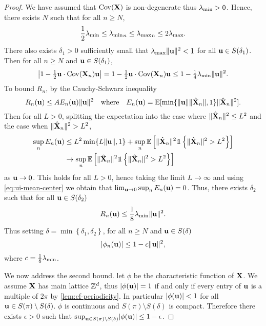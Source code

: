 \begin{proof}
    We have assumed that $\cov(\vX)$ is non-degenerate thus $\mineval > 0$. Hence, there exists $N$ such that for all $n \geq N$,
    \begin{equation*}
        \frac{1}{2} \mineval \leq \mineval_n \leq \maxeval_n \leq 2 \maxeval.
    \end{equation*}
    There also exists $\delta_1 > 0$ sufficiently small that $\maxeval \norm{\vu}^2 < 1$ for all $\vu \in S(\delta_1)$. Then for all $n \geq N$ and $\vu \in S(\delta_1)$,
    \begin{equation}
        \abs*{1 - \tfrac{1}{2} \vu \cdot \cov(\vX_n) \vu }
        = 1 - \tfrac{1}{2} \vu \cdot \cov(\vX_n) \vu
        \leq 1 - \tfrac{1}{4} \mineval \norm{\vu}^2. \label{eq:qf-bound}
    \end{equation}
    To bound $R_n$, by the Cauchy-Schwarz inequality
    \begin{equation*}
        R_n(\vu) \leq A E_n(\vu) \norm{\vu}^2
        \quad \text{where} \quad
        E_n(\vu) = \E[\min\{\norm{\vu} \norm{\centeredX_n}, 1\} \norm{\centeredX_n}^2].
    \end{equation*}
    Then for all $L > 0$, splitting the expectation into the case where $\norm{\centeredX_n}^2 \leq L^2$ and the case when $\norm{\centeredX_n}^2 > L^2$,
    \begin{align*}
        \sup_n E_n(\vu)
        &\leq L^2 \min\{L \norm{\vu}, 1\} +
        \sup_n \E\left[ \norm{\centeredX_n}^2 \one\left\{ \norm{\centeredX_n}^2 > L^2 \right\}
        \right] \\
        &\to \sup_n \E\left[ \norm{\centeredX_n}^2 \one\left\{ \norm{\centeredX_n}^2 > L^2 \right\}
        \right] 
    \end{align*}
    as $\vu \to 0$. This holds for all $L > 0$, hence taking the limit $L \to \infty$ and using \cref{eq:ui-mean-center} we obtain that $\lim_{\vu \to 0} \sup_n E_n(\vu) = 0$. Thus, there exists $\delta_2$ such that for all $\vu \in S(\delta_2)$
    \begin{equation}
        \label{eq:rn-bound}
        R_n(\vu) \leq \frac{1}{8} \mineval \norm{\vu}^2.
    \end{equation}
    Thus setting $\delta = \min\left\{ \delta_1, \delta_2 \right\}$, for all $n \geq N$ and $\vu \in S(\delta)$
    \begin{equation*}
        \abs{\phi_n(\vu)} \leq 1 - c \norm{\vu}^2,
    \end{equation*}
    where $c = \frac{1}{8} \mineval$.

    We now address the second bound. let $\phi$ be the characteristic function of $\vX$. We assume $\vX$ has main lattice $\Z^d$, thus $\abs{\phi(\vu)} = 1$ if and only if every entry of $\vu$ is a multiple of $2 \pi$ by \cref{lem:cf-periodicity}. In particular $\abs{\phi(\vu)} < 1$ for all $\vu \in S(\pi) \setminus S(\delta)$. $\phi$ is continuous and $S(\pi) \setminus S(\delta)$ is compact. Therefore there exists $\epsilon > 0$ such that $\sup_{\vu \in S(\pi) \setminus S(\delta)} \abs{\phi(\vu)} \leq 1 - \epsilon$.


\end{proof}
